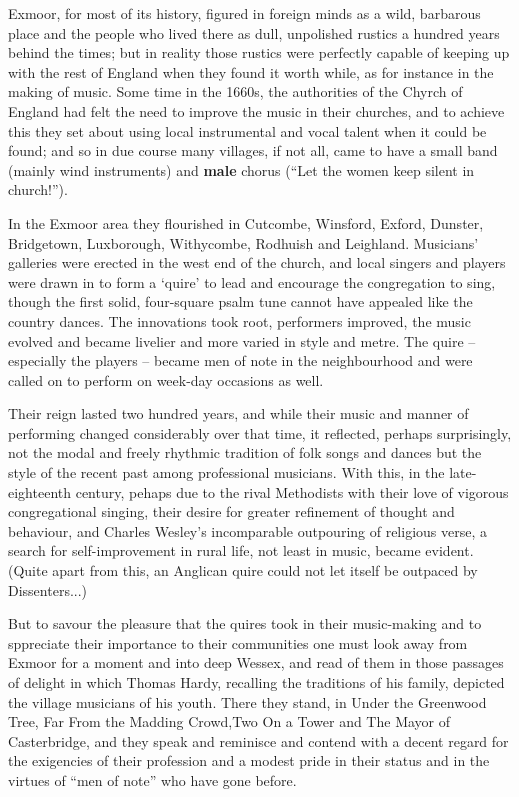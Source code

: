  
Exmoor, for most of its history, figured in foreign minds as a wild, barbarous place and the people who lived there as dull, unpolished rustics a hundred years behind the times; but in reality those rustics were perfectly capable of keeping up with the rest of England when they found it worth while, as for instance in the making of music. 
 Some time in the 1660s, the authorities of the Chyrch of England had felt the need to improve the music in their churches, and to achieve this they set about using local instrumental and vocal talent when it could be found; and so in due course many villages, if not all, came to have a small band (mainly wind instruments) and \textbf{male} chorus (“Let the women keep silent in church!”).

In the Exmoor area they flourished in Cutcombe, Winsford, Exford, Dunster, Bridgetown, Luxborough, Withycombe, Rodhuish and Leighland. Musicians’ galleries were erected in the west end of the church, and local singers and players were drawn in to form a ‘quire’ to lead and encourage the congregation to sing, though the first solid, four-square psalm tune cannot have appealed like the country dances. The innovations took root, performers improved, the music evolved and became livelier and more varied in style and metre. The quire – especially the players – became men of note in the neighbourhood and were called on to perform on week-day occasions as well.

Their reign lasted two hundred years, and while their music and manner of performing changed considerably over that time, it reflected, perhaps surprisingly, not the modal and freely rhythmic tradition of folk songs and dances but the style of the recent past among professional musicians. With this, in the late-eighteenth century, pehaps due to the rival Methodists with their love of vigorous congregational singing, their desire for greater refinement of thought and behaviour, and Charles Wesley’s incomparable outpouring of religious verse, a search for self-improvement in rural life, not least in music, became evident. (Quite apart from this, an Anglican quire could not let itself be outpaced by Dissenters...) 

But to savour the pleasure that the quires took in their music-making and to sppreciate their importance to their communities one must look away from Exmoor for a moment and into deep Wessex, and read of them in those passages of delight in which Thomas Hardy, recalling the traditions of his family, depicted the village musicians of his youth. There they stand, in Under the Greenwood Tree, Far From the Madding Crowd,Two On a Tower and The Mayor of Casterbridge, and they speak and reminisce and contend with a decent regard for the exigencies of their profession and a modest pride in their status and in the virtues of “men of note” who have gone before.

